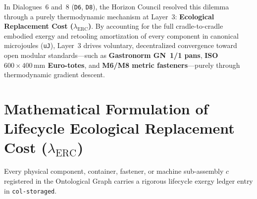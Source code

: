 In Dialogues~6 and~8 (\texttt{D6}, \texttt{D8}), the Horizon Council resolved this dilemma through a purely thermodynamic mechanism at Layer~3: \textbf{Ecological Replacement Cost ($\lambda_{\mathrm{ERC}}$)}. By accounting for the full cradle-to-cradle embodied exergy and retooling amortization of every component in canonical microjoules (\texttt{uJ}), Layer~3 drives voluntary, decentralized convergence toward open modular standards---such as \textbf{Gastronorm GN~1/1 pans}, \textbf{ISO $600 \times 400\,\mathrm{mm}$ Euro-totes}, and \textbf{M6/M8 metric fasteners}---purely through thermodynamic gradient descent.

\section{Mathematical Formulation of Lifecycle Ecological Replacement Cost ($\lambda_{\mathrm{ERC}}$)}
\label{sec:ch2-erc-math}

Every physical component, container, fastener, or machine sub-assembly $c$ registered in the Ontological Graph carries a rigorous lifecycle exergy ledger entry in \texttt{col-storaged}.

